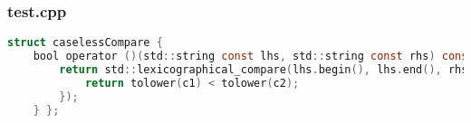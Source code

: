 \subsubsection{test.cpp}
\begin{lstlisting}[style=frame, style= linenumbers, language=C]
struct caselessCompare {
	bool operator ()(std::string const lhs, std::string const rhs) const {
		return std::lexicographical_compare(lhs.begin(), lhs.end(), rhs.begin(), rhs.end(), [](char c1, char c2) {
			return tolower(c1) < tolower(c2);
		});
	} };
\end{lstlisting}